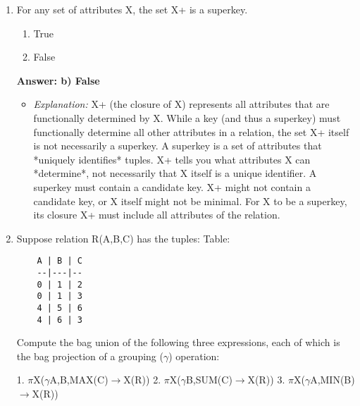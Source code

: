 \documentclass{article}
\begin{document}
\begin{enumerate}[label=\textbf{Question \arabic*.}]
\item For any set of attributes X, the set X+ is a superkey.
    \begin{enumerate}[label=\alph*)]
        \item True
        \item False
    \end{enumerate}
    \textbf{Answer: b) False}
    \begin{itemize}
        \item \textit{Explanation:} X+ (the closure of X) represents all attributes that are functionally determined by X. While a key (and thus a superkey) must functionally determine all other attributes in a relation, the set X+ itself is not necessarily a superkey. A superkey is a set of attributes that *uniquely identifies* tuples. X+ tells you what attributes X can *determine*, not necessarily that X itself is a unique identifier. A superkey must contain a candidate key. X+ might not contain a candidate key, or X itself might not be minimal. For X to be a superkey, its closure X+ must include all attributes of the relation.
    \end{itemize}

\item Suppose relation R(A,B,C) has the tuples:
    Table:
    \begin{verbatim}
    A | B | C
    --|---|--
    0 | 1 | 2
    0 | 1 | 3
    4 | 5 | 6
    4 | 6 | 3
    \end{verbatim}
    Compute the bag union of the following three expressions, each of which is the bag projection of a grouping ($\gamma$) operation:

    1. $\pi$X($\gamma$A,B,MAX(C)$\rightarrow$X(R))
    2. $\pi$X($\gamma$B,SUM(C)$\rightarrow$X(R))
    3. $\pi$X($\gamma$A,MIN(B)$\rightarrow$X(R))


\end{enumerate}
\end{document}
